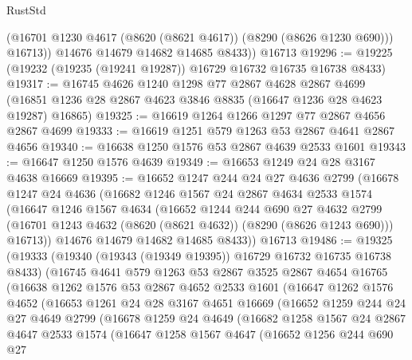 \begin{lexlean}{RustStd}
\begin{coremodule}
            (@16701 @1230 @4617 (@8620 (@8621 @4617)) (@8290 (@8626 @1230 @690)))
            @16713))
        @14676
        @14679
        @14682
        @14685
        @8433))
    @16713
@19296 := @19225 (@19232 (@19235 (@19241 @19287)) @16729 @16732 @16735 @16738 @8433)
@19317 := @16745
    @4626
    @1240
    @1298
    @77
    @2867
    @4628
    @2867
    @4699
    (@16851 @1236 @28 @2867 @4623 @3846 @8835 (@16647 @1236 @28 @4623 @19287) @16865)
@19325 := @16619 @1264 @1266 @1297 @77 @2867 @4656 @2867 @4699
@19333 := @16619 @1251 @579 @1263 @53 @2867 @4641 @2867 @4656
@19340 := @16638 @1250 @1576 @53 @2867 @4639 @2533 @1601
@19343 := @16647 @1250 @1576 @4639
@19349 := @16653 @1249 @24 @28 @3167 @4638 @16669
@19395 := @16652
    @1247
    @244
    @24
    @27
    @4636
    @2799
    (@16678
      @1247
      @24
      @4636
      (@16682
        @1246
        @1567
        @24
        @2867
        @4634
        @2533
        @1574
        (@16647
          @1246
          @1567
          @4634
          (@16652
            @1244
            @244
            @690
            @27
            @4632
            @2799
            (@16701 @1243 @4632 (@8620 (@8621 @4632)) (@8290 (@8626 @1243 @690)))
            @16713))
        @14676
        @14679
        @14682
        @14685
        @8433))
    @16713
@19486 := @19325
    (@19333
      (@19340 (@19343 (@19349 @19395)) @16729 @16732 @16735 @16738 @8433)
      (@16745
        @4641
        @579
        @1263
        @53
        @2867
        @3525
        @2867
        @4654
        @16765
        (@16638
          @1262
          @1576
          @53
          @2867
          @4652
          @2533
          @1601
          (@16647
            @1262
            @1576
            @4652
            (@16653
              @1261
              @24
              @28
              @3167
              @4651
              @16669
              (@16652
                @1259
                @244
                @24
                @27
                @4649
                @2799
                (@16678
                  @1259
                  @24
                  @4649
                  (@16682
                    @1258
                    @1567
                    @24
                    @2867
                    @4647
                    @2533
                    @1574
                    (@16647
                      @1258
                      @1567
                      @4647
                      (@16652
                        @1256
                        @244
                        @690
                        @27

\end{coremodule}
\end{lexlean}
